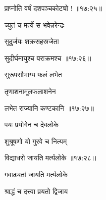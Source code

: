 \nemslokad

{\devanagarifontbold प्राप्नोति वर्षं दशपञ्चकोट्यो !  {॥१७:२५॥} \veg\dontdisplaylinenum }%
 
\ujvers{}

\nemslokab

{\devanagarifontbold च्युतं च मर्त्ये स भवेन्नरेन्द्रः  \danda\dontdisplaylinenum }%
 
\nemslokac

{\devanagarifontbold सुदुर्जयः शक्रसहस्रजेता }%
  \dontdisplaylinenum

\nemslokad

{\devanagarifontbold सुदीर्घमायुश्च पराक्रमश्च {॥१७:२६॥} \veg\dontdisplaylinenum }%
 
\ujvers{}

\nemslokab

{\devanagarifontbold सुरूपसौभाग्य फलं लभेत  \danda\dontdisplaylinenum }%
 
\nemslokac

{\devanagarifontbold तृणाशनामूलफलाशनेन }%
  \dontdisplaylinenum

\nemslokad

{\devanagarifontbold लभेत राज्यानि कण्टकानि {॥१७:२७॥} \veg\dontdisplaylinenum }%
 
\ujvers{}

\nemslokab

{\devanagarifontbold पयः प्रयोगेन च देवलोके  \danda\dontdisplaylinenum }%
 
\nemslokac

{\devanagarifontbold शुश्रूषणो यो गुरवे च नित्यम् }%
  \dontdisplaylinenum

\nemslokad

{\devanagarifontbold विद्याधरो जायति मर्त्यलोके {॥१७:२८॥} \veg\dontdisplaylinenum }%
 
\ujvers{}

\nemslokab

{\devanagarifontbold गवाढ्यतां जायति मर्त्यलोके  \danda\dontdisplaylinenum }%
 
\nemslokac

{\devanagarifontbold श्राद्धं च दत्त्वा प्रयतो द्विजाय }%
  \dontdisplaylinenum

